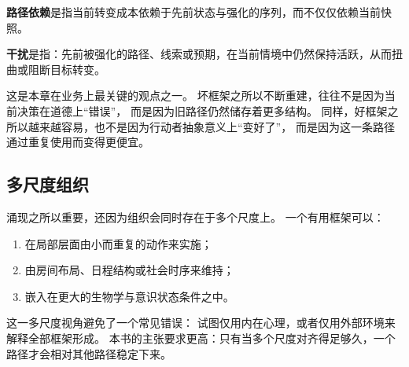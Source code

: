 \begin{definition}[路径依赖]
\textbf{路径依赖}是指当前转变成本依赖于先前状态与强化的序列，而不仅仅依赖当前快照。
\end{definition}

\begin{definition}[干扰]
\textbf{干扰}是指：先前被强化的路径、线索或预期，在当前情境中仍然保持活跃，从而扭曲或阻断目标转变。
\end{definition}

\begin{discussion}
这是本章在业务上最关键的观点之一。
坏框架之所以不断重建，往往不是因为当前决策在道德上“错误”，
而是因为旧路径仍然储存着更多结构。
同样，好框架之所以越来越容易，也不是因为行动者抽象意义上“变好了”，
而是因为这一条路径通过重复使用而变得更便宜。
\end{discussion}

\subsection{多尺度组织}

涌现之所以重要，还因为组织会同时存在于多个尺度上。
一个有用框架可以：
\begin{enumerate}[nosep]
  \item 在局部层面由小而重复的动作来实施；
  \item 由房间布局、日程结构或社会时序来维持；
  \item 嵌入在更大的生物学与意识状态条件之中。
\end{enumerate}

这一多尺度视角避免了一个常见错误：
试图仅用内在心理，或者仅用外部环境来解释全部框架形成。
本书的主张要求更高：只有当多个尺度对齐得足够久，一个路径才会相对其他路径稳定下来。